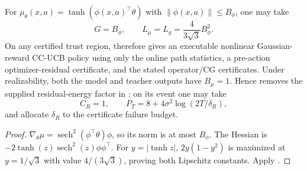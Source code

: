 \begin{corollary}\label{cor:tanh-link}
For
$\mu_\theta(x,a)=\tanh(\phi(x,a)^\top\theta)$ with
$\|\phi(x,a)\|\le B_\phi$, one may take
\[
 G=B_\phi,\qquad
 L_\mu=L_g=\frac{4}{3\sqrt3}B_\phi^2.
\]
On any certified trust region,  therefore gives an
executable nonlinear Gaussian-reward CC-UCB policy using only the online path
statistics, a pre-action optimizer-residual certificate, and the stated
operator/CG certificates.
Under realizability, both the model and teacher outputs have $B_\mu=1$.
Hence  removes the supplied residual-energy
factor in : on its event one may take
\[
 C_R=1,\qquad
 P_T=8+4\sigma^2\log(2T/\delta_R),
\]
and allocate $\delta_R$ to the certificate failure budget.
\end{corollary}
\begin{proof}
$\nabla_\theta\mu=\operatorname{sech}^2(\phi^\top\theta)\phi$, so its norm is
at most $B_\phi$.  The Hessian is
$-2\tanh(z)\operatorname{sech}^2(z)\phi\phi^\top$.
For $y=|\tanh z|$, $2y(1-y^2)$ is maximized at $y=1/\sqrt3$ with value
$4/(3\sqrt3)$, proving both Lipschitz constants.  Apply
.
\end{proof}

